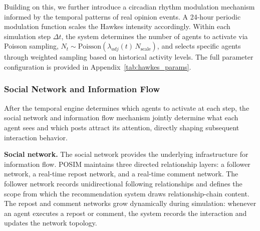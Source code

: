 \documentclass[a4paper,fleqn]{cas-dc}
\begin{document}
Building on this, we further introduce a circadian rhythm modulation mechanism informed by the temporal patterns of real opinion events. A 24-hour periodic modulation function scales the Hawkes intensity accordingly. Within each simulation step $\Delta t$, the system determines the number of agents to activate via Poisson sampling, $N_t \sim \text{Poisson}(\lambda_{adj}(t)\, N_{\text{scale}})$, and selects specific agents through weighted sampling based on historical activity levels. The full parameter configuration is provided in Appendix~\ref{tab:hawkes_params}.

\subsubsection{Social Network and Information Flow}

After the temporal engine determines which agents to activate at each step, the social network and information flow mechanism jointly determine what each agent sees and which posts attract its attention, directly shaping subsequent interaction behavior.

\textbf{Social network.} The social network provides the underlying infrastructure for information flow. POSIM maintains three directed relationship layers: a follower network, a real-time repost network, and a real-time comment network. The follower network records unidirectional following relationships and defines the scope from which the recommendation system draws relationship-chain content. The repost and comment networks grow dynamically during simulation: whenever an agent executes a repost or comment, the system records the interaction and updates the network topology.
\end{document}
